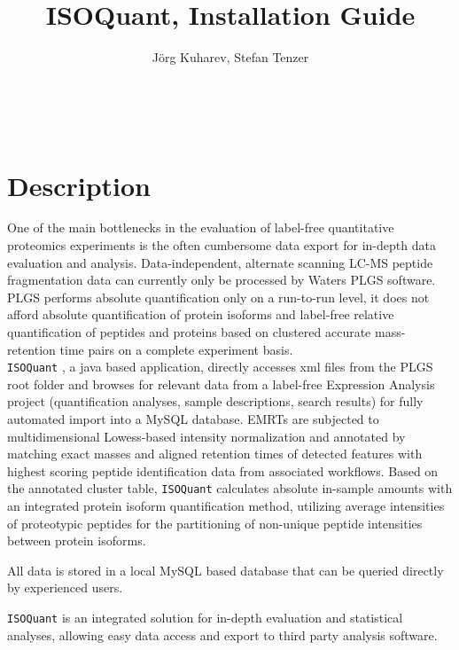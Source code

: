 \documentclass[a4paper,12pt]{scrartcl}
\title{ ISOQuant, Installation Guide \hr}
\author{ J\"org Kuharev, Stefan Tenzer}
\newcommand{\iq}{\texttt{ISOQuant} }
\newcommand{\hr}{\underline{\hspace{\textwidth}} \\}
\begin{document}
\maketitle
\hr
\tableofcontents
\newpage

\section{Description}
One of the main bottlenecks in the evaluation of 
		label-free quantitative proteomics experiments is 
		the often cumbersome data export for in-depth data 
		evaluation and analysis. Data-independent, 
		alternate scanning LC-MS peptide fragmentation 
		data can currently only be processed by Waters PLGS software.
		$~$\\
		PLGS performs absolute quantification only on a 
		run-to-run level, it does not afford absolute 
		quantification of protein isoforms and label-free 
		relative quantification of peptides and proteins 
		based on clustered accurate mass-retention time 
		pairs on a complete experiment basis.
		$~$\\
		\iq, a java based application, directly accesses 
		xml files from the PLGS root folder and browses for 
		relevant data from a label-free Expression Analysis 
		project (quantification analyses, sample descriptions, 
		search results) for fully automated import into a MySQL database. 
		EMRTs are subjected to multidimensional Lowess-based intensity 
		normalization and annotated by matching exact masses and aligned 
		retention times of detected features with highest scoring peptide 
		identification data from associated workflows. 
		Based on the annotated cluster table, \iq calculates 
		absolute in-sample amounts with an integrated 
		protein isoform quantification method, utilizing average 
		intensities of proteotypic peptides for the partitioning 
		of non-unique peptide intensities between protein isoforms.

		All data is stored in a local MySQL based database that 
		can be queried directly by experienced users.

		\iq is an integrated solution for in-depth evaluation 
		and statistical analyses, allowing easy data access and 
		export to third party analysis software. \\
\newpage
\end{document}
